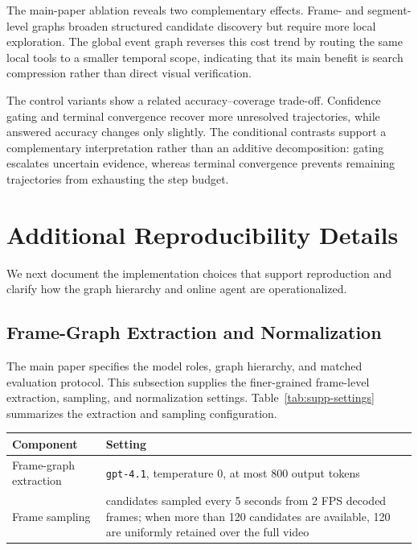 The main-paper ablation reveals two complementary effects.
Frame- and segment-level graphs broaden structured candidate discovery but require more local exploration.
The global event graph reverses this cost trend by routing the same local tools to a smaller temporal scope, indicating that its main benefit is search compression rather than direct visual verification.

The control variants show a related accuracy--coverage trade-off.
Confidence gating and terminal convergence recover more unresolved trajectories, while answered accuracy changes only slightly.
The conditional contrasts support a complementary interpretation rather than an additive decomposition: gating escalates uncertain evidence, whereas terminal convergence prevents remaining trajectories from exhausting the step budget.

\section{Additional Reproducibility Details}
\label{sec:supp-reproducibility}

We next document the implementation choices that support reproduction and clarify how the graph hierarchy and online agent are operationalized.

\subsection{Frame-Graph Extraction and Normalization}

The main paper specifies the model roles, graph hierarchy, and matched evaluation protocol.
This subsection supplies the finer-grained frame-level extraction, sampling, and normalization settings.
Table~\ref{tab:supp-settings} summarizes the extraction and sampling configuration.

\begin{center}
  \centering
  \small
  \setlength{\tabcolsep}{4pt}
  \begin{tabularx}{\columnwidth}{@{}lY@{}}
    \toprule
    \textbf{Component} & \textbf{Setting} \\
    \midrule
    Frame-graph extraction &
    \texttt{gpt-4.1}, temperature 0, at most 800 output tokens \\
    Frame sampling &
    candidates sampled every 5 seconds from 2 FPS decoded frames; when more than 120 candidates are available, 120 are uniformly retained over the full video \\
    \bottomrule
  \end{tabularx}
  \label{tab:supp-settings}
\end{center}

